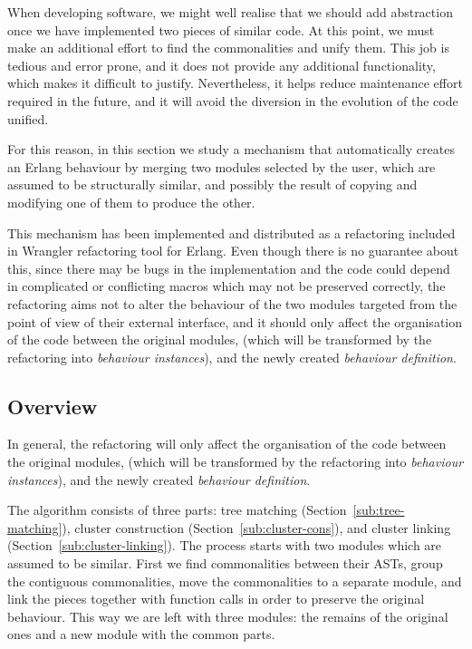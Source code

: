 When developing software, we might well realise that we should add
abstraction once we have implemented two pieces of similar
code. At this point, we must make an additional effort to find the
commonalities and unify them. This job is tedious and error prone,
and it does not provide any additional functionality, which makes
it difficult to justify. Nevertheless, it helps reduce maintenance
effort required in the future, and it will avoid the diversion in
the evolution of the code unified.

For this reason, in this section we study a mechanism that automatically
creates an Erlang behaviour by merging two modules selected by the
user, which are assumed to be structurally similar, and possibly the
result of copying and modifying one of them to produce the other.

This mechanism has been implemented and distributed as a refactoring
included in Wrangler refactoring tool for Erlang. Even though there is no
guarantee about this, since there may be bugs in the implementation and
the code could depend in complicated or conflicting macros which may
not be preserved correctly, the refactoring aims not to alter the behaviour
of the two modules targeted from the point of view of their external
interface, and it should only affect the organisation of the code
between the original modules, (which will be transformed by the refactoring
into \emph{behaviour instances}), and the newly created \emph{behaviour
definition}.

\subsection{Overview}

In general, the refactoring will only affect the organisation
of the code between the original modules, (which will be transformed by
the refactoring into \emph{behaviour instances}), and the newly created
\emph{behaviour definition}.


The algorithm consists of three parts: tree matching 
(Section~\ref{sub:tree-matching}), cluster construction 
(Section~\ref{sub:cluster-cons}), and cluster linking 
(Section~\ref{sub:cluster-linking}). The process starts with two 
modules which are assumed to be similar. First we find commonalities between 
their ASTs,
group the contiguous commonalities, move the commonalities to a separate
module, and link the pieces together with function calls in order
to preserve the original behaviour. This way we are left with three
modules: the remains of the original ones and a new module with
the common parts.



